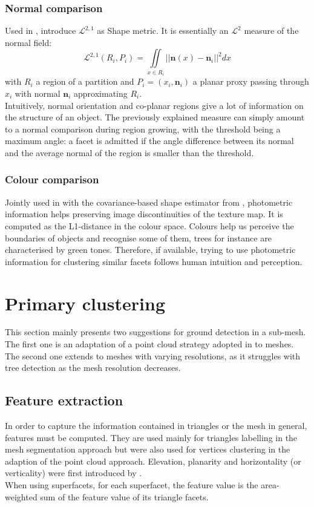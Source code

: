 \documentclass{kththesis}
\begin{document}
\subsubsection{Normal comparison}
Used in \textcite{rouhani}, \textcite{CohenSteiner:2004} introduce $\mathcal{L}^{2,1}$ as Shape metric. It is essentially an $\mathcal{L}^2$ measure of the normal field: 
$$\mathcal{L}^{2,1}(R_i, P_i)= \iint \limits_{x \in R_i} ||\mathbf{n}(x) - \mathbf{n}_i||^2dx$$
with $R_i$ a region of a partition and $P_i=(x_i, \mathbf{n}_i)$ a planar proxy passing through $x_i$ with normal $\mathbf{n}_i$ approximating $R_i$. \\

Intuitively, normal orientation and co-planar regions give a lot of information on the structure of an object. The previously explained measure can simply amount to a normal comparison during region growing, with the threshold being a maximum angle: a facet is admitted if the angle difference between its normal and the average normal of the region is smaller than the threshold. 
\subsubsection{Colour comparison}
Jointly used in \textcite{rouhani} with the covariance-based shape estimator from \textcite{CohenSteiner:2004}, photometric information helps preserving image discontinuities of the texture map. It is computed as the L1-distance in the colour space. Colours help us perceive the boundaries of objects and recognise some of them, trees for instance are characterised by green tones. Therefore, if available, trying to use photometric information for clustering similar facets follows human intuition and perception. 


\section{Primary clustering}
This section mainly presents two suggestions for ground detection in a sub-mesh. The first one is an adaptation of a point cloud strategy adopted in \parencite{HernandezArtefacts, det_seg_class} to meshes. The second one extends \parencite{verdie} to meshes with varying resolutions, as it struggles with tree detection as the mesh resolution decreases. 
\subsection{Feature extraction}
\label{sec:ft_extract}
In order to capture the information contained in triangles or the mesh in general, features must be computed. They are used mainly for triangles labelling in the mesh segmentation approach but were also used for vertices clustering in the adaption of the point cloud approach. Elevation, planarity and horizontality (or verticality) were first introduced by \textcite{verdie}. \\ 
When using superfacets, for each superfacet, the feature value is  the area-weighted sum of the feature value
of its triangle facets.
\end{document}
